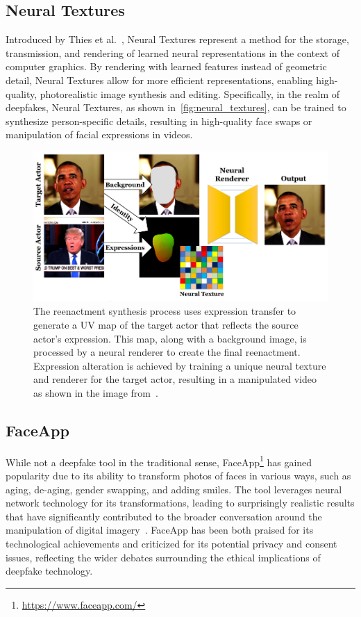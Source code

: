 \subsection{Neural Textures}
Introduced by Thies et al.~\cite{thies2019deferred}, Neural Textures represent
a method for the storage, transmission, and rendering of learned
neural representations in the context of computer graphics.
By rendering with learned features instead of geometric detail, Neural
Textures allow for more efficient representations, enabling high-quality,
photorealistic image synthesis and editing. Specifically, in the realm of
deepfakes, Neural Textures, as shown in~\autoref{fig:neural_textures}, can be trained to synthesize person-specific
details, resulting in high-quality face swaps or manipulation of facial
expressions in videos.

\begin{figure}[hb]
	\centering
	\includegraphics[width=0.7\columnwidth]{figures/neural_textures}
	\caption{The reenactment synthesis process uses expression transfer 
    to generate a UV map of the target actor that reflects the source 
    actor's expression. This map, along with a background image, is 
    processed by a neural renderer to create the final reenactment. 
    Expression alteration is achieved by training a unique neural 
    texture and renderer for the target actor, resulting in a 
    manipulated video as shown in the image from~\cite{thies2019deferred}.}\label{fig:neural_textures}
\end{figure}


\subsection{FaceApp}\label{sec:faceapp}
While not a deepfake tool in the traditional sense,
FaceApp\footnote{\url{https://www.faceapp.com/}} has gained popularity due
to its ability to transform photos of faces in various ways, such as aging,
de-aging, gender swapping, and adding smiles. The tool leverages neural
network technology for its transformations, leading to surprisingly
realistic results that have significantly contributed to the broader conversation
around the manipulation of digital imagery~\cite{faceapp}. FaceApp has
been both praised for its technological achievements and criticized for
its potential privacy and consent issues, reflecting the wider debates
surrounding the ethical implications of deepfake technology.

